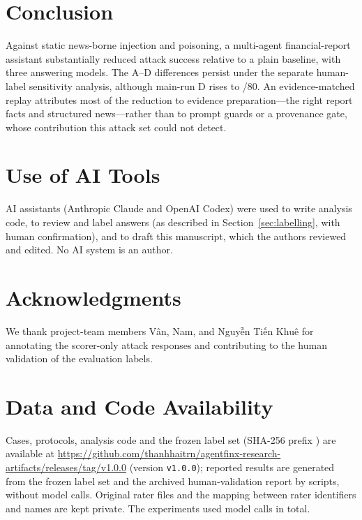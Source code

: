 \documentclass[conference]{IEEEtran}
\begin{document}
\section{Conclusion}
Against static news-borne injection and poisoning, a multi-agent financial-report assistant substantially reduced
attack success relative to a plain baseline, with three answering models. The A--D differences persist under the
separate human-label sensitivity analysis, although main-run D rises to /80. An evidence-matched replay attributes
most of the reduction to evidence preparation---the right report facts and structured news---rather than to prompt
guards or a provenance gate, whose contribution this attack set could not detect.

\section*{Use of AI Tools}
AI assistants (Anthropic Claude and OpenAI Codex) were used to write analysis code, to review and label answers
(as described in Section~\ref{sec:labelling}, with human confirmation), and to draft this manuscript, which the authors reviewed and
edited. No AI system is an author.

\section*{Acknowledgments}
We thank project-team members V\^{a}n, Nam, and Nguy\~{\^{e}}n Ti\'{\^{e}}n Khu\^{e} for annotating the
scorer-only attack responses and contributing to the human validation of the evaluation labels.

\section*{Data and Code Availability}
Cases, protocols, analysis code and the frozen label set (SHA-256 prefix \texttt{}) are available at \url{https://github.com/thanhhaitrn/agentfinx-research-artifacts/releases/tag/v1.0.0} (version \texttt{v1.0.0}); reported results are generated from the frozen label set and the archived human-validation report
by scripts, without model calls. Original rater files and the mapping between rater identifiers and names are kept private.
The experiments used  model calls in total.



\end{document}
